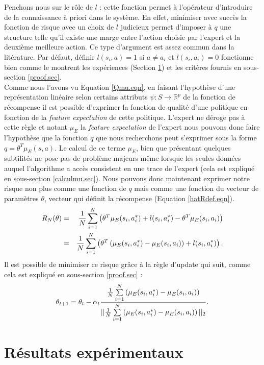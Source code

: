 \documentclass[publibook-draft]{CAp2012}
\begin{document}
Penchons nous sur le rôle de $l$ : cette fonction permet à l'opérateur d'introduire de la connaissance à priori dans le système. En effet, minimiser avec succès la fonction de risque avec un choix de $l$ judicieux permet d'imposer à $q$ une structure telle qu'il existe une marge entre l'action choisie par l'expert et la deuxième meilleure action. Ce type d'argument est assez commun dans la litérature. Par défaut, définir $l(s_i,a) = 1$ si $a\neq a_i$ et $l(s_i,a_i)=0$ fonctionne bien comme le montrent les expériences (Section \ref{exp.sec}) et les critères fournis en sous-section \ref{proof.sec}.\\


Comme nous l'avons vu Equation \ref{Qmu.eqn}, en faisant l'hypothèse d'une représentation linéaire selon certains attributs $\psi : S\rightarrow \mathbb{R}^p$ de la fonction de récompense il est possible d'exprimer la fonction de qualité d'une politique en fonction de la {\it feature expectation} de cette politique. L'expert ne déroge pas à cette règle et notant $\mu_E$ la {\it feature expectation} de l'expert nous pouvons donc faire l'hypothèse que la fonction $q$ que nous recherchons peut s'exprimer sous la forme $q = \theta^T\mu_E(s,a)$. Le calcul de ce terme $\mu_E$, bien que présentant quelques subtilités ne pose pas de problème majeurs même lorsque les seules données auquel l'algorithme a accès consistent en une trace de l'expert (cela est expliqué en sous-section \ref{calculmu.sec}). Nous pouvons donc maintenant exprimer notre risque non plus comme une fonction de $q$ mais comme une fonction du vecteur de paramètres $\theta$, vecteur qui définit la récompense (Equation \ref{hatRdef.eqn}).
   \begin{eqnarray}
   R_N(\theta) &=& {1\over N} \sum_{i=1}^N\left(\theta ^T \mu_E(s_i,a^*_i) + l(s_i,a^*_i) - \theta ^T \mu_E(s_i,a_i) \right)\\
   &=& {1\over N} \sum_{i=1}^N\left(\theta^T\left(\mu_E(s_i,a^*_i) - \mu_E(s_i,a_i)\right) + l(s_i,a^*_i)  \right).
   \end{eqnarray}
   Il est possible de minimiser ce risque grâce à la règle d'update qui suit, comme cela est expliqué en sous-section \ref{proof.sec} :
   \begin{equation}
   \theta_{t+1} = \theta_t -\alpha_t{{1\over N}\sum\limits_{i=1}^N\left(\mu_E(s_i,a^*_i) - \mu_E(s_i,a_i)\right)\over ||{1\over N}\sum\limits_{i=1}^N\left(\mu_E(s_i,a^*_i) - \mu_E(s_i,a_i)\right)||_2}.
   \end{equation}
\section{Résultats expérimentaux}
\label{exp.sec}
\end{document}
